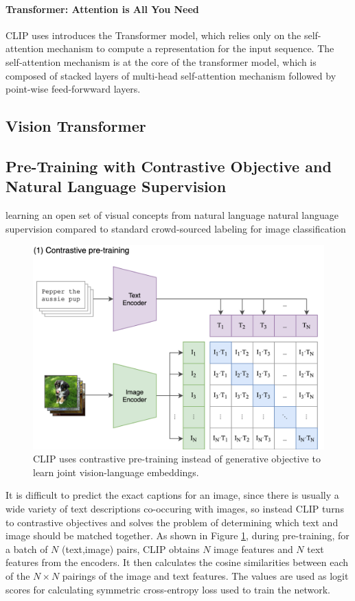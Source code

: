 \paragraph{Transformer: Attention is All You Need}
CLIP uses 
\citet{attentionAllYouNeed} introduces the Transformer model, which relies only on the self-attention mechanism to compute a representation for the input sequence.  
The self-attention mechanism is at the core of the transformer model, which is composed of stacked layers of multi-head self-attention mechanism followed by point-wise feed-forwward layers.   

\subsection{Vision Transformer}


\subsection{Pre-Training with Contrastive Objective and Natural Language Supervision}
learning an open set of visual concepts from natural language
natural language supervision compared to standard crowd-sourced labeling for image classification

\begin{figure}[!htb]
\includegraphics[width=0.7\linewidth]{modeling/CLIP.png}  
\caption{CLIP uses contrastive pre-training instead of generative objective to learn joint vision-language embeddings.}
\label{modeling.clip.pretrainingobj}
\end{figure}

It is difficult to predict the exact captions for an image, since there is usually a wide variety of text descriptions co-occuring with images, so instead CLIP turns to contrastive objectives and solves the problem of determining which text and image should be matched together. 
As shown in Figure \ref{modeling.clip.pretrainingobj}, during pre-training, for a batch of $N$ (text,image) pairs, CLIP obtains $N$ image features and $N$ text features from the encoders. It then calculates the cosine similarities between each of the $N \times N$ pairings of the image and text features. The values are used as logit scores for calculating symmetric cross-entropy loss used to train the network.      


